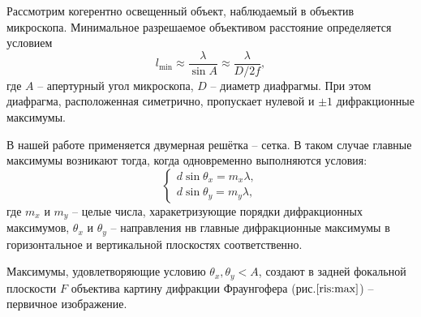 \documentclass[a4paper,12pt]{article}
\begin{document}
	Рассмотрим когерентно освещенный объект, наблюдаемый в объектив микроскопа. Минимальное разрешаемое объективом расстояние определяется условием
	\begin{equation}
		\label{eq:min}
		l_{\text{min}} \approx \frac{\lambda}{\sin A} \approx \frac{\lambda}{D/2f},
	\end{equation}
	где $A$ -- апертурный угол микроскопа, $D$ -- диаметр диафрагмы. При этом диафрагма, расположенная симетрично, пропускает нулевой и $\pm 1$ дифракционные максимумы.
	
	В нашей работе применяется двумерная решётка -- сетка. В таком случае главные максимумы возникают тогда, когда одновременно выполняются условия:
	\begin{equation}
		\label{eq:max}
		\begin{cases}
			d \sin \theta_x = m_x \lambda, \\
			d \sin \theta_y = m_y \lambda,
		\end{cases}
	\end{equation}
	где $m_x$ и $m_y$ -- целые числа, харакетризующие порядки дифракционных максимумов, $\theta_x$ и $\theta_y$ -- направления нв главные дифракционные максимумы в горизонтальное и вертикальной плоскостях соответственно.
	
	Максимумы, удовлетворяющие условию $\theta_x, \theta_y < A$, создают в задней фокальной плоскости $F$ объектива картину дифракции Фраунгофера (рис.$\ref{ris:max}$) -- первичное изображение.
	
\end{document}
